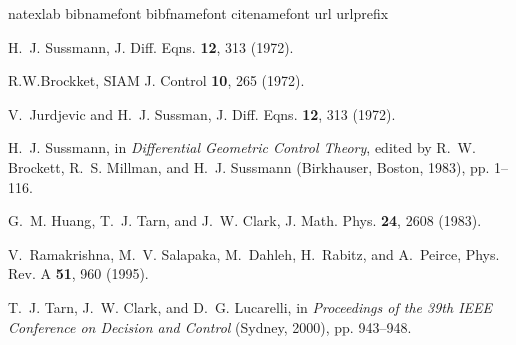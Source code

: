 \documentclass[onecolumn,showpacs,showkeys,preprintnumbers]{revtex4}
\begin{document}
\begin{thebibliography}{23}
\expandafter\ifx\csname
natexlab\endcsname\relax\fi
\expandafter\ifx\csname bibnamefont\endcsname\relax
  \fi
\expandafter\ifx\csname bibfnamefont\endcsname\relax
  \fi
\expandafter\ifx\csname citenamefont\endcsname\relax
  \fi
\expandafter\ifx\csname url\endcsname\relax
  \fi
\expandafter\ifx\csname
urlprefix\endcsname\relax\fi
\providecommand{\bibinfo}[2]{#2}
\providecommand{\eprint}[2][]{{\texttt{{#2}}}}

\bibinfo{author}{{{H.~J.}} {{Sussmann}}},
  \bibinfo{journal}{J. Diff. Eqns.} \textbf{\bibinfo{volume}{12}},
  \bibinfo{pages}{313} (\bibinfo{year}{1972}).

\bibinfo{author}{{{R.W.Brockket}}}, \bibinfo{journal}{SIAM J.
  Control} \textbf{\bibinfo{volume}{10}}, \bibinfo{pages}{265}
  (\bibinfo{year}{1972}).

\bibinfo{author}{{{V.}}~{{Jurdjevic}}} {{and}}
  \bibinfo{author}{{{H.~J.}} {{Sussman}}},
  \bibinfo{journal}{J. Diff. Eqns.} \textbf{\bibinfo{volume}{12}},
  \bibinfo{pages}{313} (\bibinfo{year}{1972}).

\bibinfo{author}{{{H.~J.}} {{Sussmann}}}, in
  \emph{\bibinfo{booktitle}{Differential Geometric Control Theory}}, edited by
  \bibinfo{editor}{{{R.~W.}} {{Brockett}}},
  \bibinfo{editor}{{{R.~S.}} {{Millman}}},
  {{and}} \bibinfo{editor}{{{H.~J.}}
  {{Sussmann}}} (\bibinfo{publisher}{Birkhauser},
  \bibinfo{address}{Boston}, \bibinfo{year}{1983}), pp.
  \bibinfo{pages}{1--116}.

\bibinfo{author}{{{G.~M.}} {{Huang}}},
  \bibinfo{author}{{{T.~J.}} {{Tarn}}}, {{and}}
  \bibinfo{author}{{{J.~W.}} {{Clark}}},
  \bibinfo{journal}{J. Math. Phys.} \textbf{\bibinfo{volume}{24}},
  \bibinfo{pages}{2608} (\bibinfo{year}{1983}).

\bibinfo{author}{{{V.}}~{{Ramakrishna}}},
  \bibinfo{author}{{{M.~V.}} {{Salapaka}}},
  \bibinfo{author}{{{M.}}~{{Dahleh}}},
  \bibinfo{author}{{{H.}}~{{Rabitz}}}, {{and}}
  \bibinfo{author}{{{A.}}~{{Peirce}}},
  \bibinfo{journal}{Phys. Rev. A} \textbf{\bibinfo{volume}{51}},
  \bibinfo{pages}{960} (\bibinfo{year}{1995}).

\bibinfo{author}{{{T.~J.}} {{Tarn}}},
  \bibinfo{author}{{{J.~W.}} {{Clark}}}, {{and}}
  \bibinfo{author}{{{D.~G.}} {{Lucarelli}}}, in
  \emph{\bibinfo{booktitle}{Proceedings of the 39th IEEE Conference on Decision
  and Control}} (\bibinfo{address}{Sydney}, \bibinfo{year}{2000}), pp.
  \bibinfo{pages}{943--948}.


\end{thebibliography}
\end{document}
